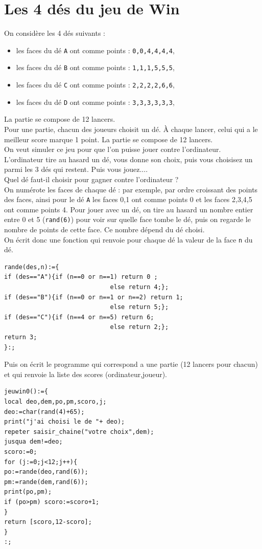 \documentclass[a4paper,11pt]{book}
\begin{document}
\section{Les 4 d\'es du jeu de Win}\label{sec:win}
On consid\`ere les 4 d\'es suivants :
\begin{itemize}
\item les faces du d\'e {\tt A} ont comme points : {\tt 0,0,4,4,4,4}, 
\item les faces du d\'e {\tt B} ont comme points : {\tt 1,1,1,5,5,5},
\item les faces du d\'e {\tt C} ont comme points : {\tt 2,2,2,2,6,6},
\item les faces du d\'e {\tt D} ont comme points : {\tt 3,3,3,3,3,3},
\end{itemize}
La partie se compose de 12 lancers.\\Pour une partie, chacun des joueurs 
choisit un d\'e. \`A chaque lancer, celui
qui a le meilleur score marque 1 point. La partie se compose de 12 lancers.\\
On veut simuler ce jeu pour que l'on puisse jouer contre l'ordinateur.
L'ordinateur tire au hasard un d\'e, vous donne son choix, puis vous
choisisez un parmi les 3 d\'es qui restent. Puis vous jouez....\\
Quel d\'e faut-il choisir pour gagner contre l'ordinateur ?
\ \\
On num\'erote les faces de chaque d\'e : par exemple, par ordre croissant des 
points des faces, ainsi pour le  d\'e {\tt A} les faces 0,1 ont comme 
points 0 et les faces 2,3,4,5 ont comme points 4.  
Pour jouer avec un d\'e, on tire au hasard un nombre entier entre 0 et 
5 ({\tt rand(6)}) pour voir sur quelle face tombe le d\'e, puis on regarde le 
nombre de points de cette face. Ce nombre d\'epend du d\'e choisi.\\
On \'ecrit donc une fonction qui renvoie pour chaque d\'e la valeur de
la face {\tt n} du d\'e. 
\begin{verbatim}
rande(des,n):={
if (des=="A"){if (n==0 or n==1) return 0 ;
                             else return 4;};
if (des=="B"){if (n==0 or n==1 or n==2) return 1; 
                             else return 5;};
if (des=="C"){if (n==4 or n==5) return 6;
                             else return 2;};
return 3;
}:;
\end{verbatim}
Puis on \'ecrit le programme qui correspond a une partie (12 lancers pour 
chacun) et qui renvoie la liste des scores (ordinateur,joueur).
\begin{verbatim}
jeuwin0():={
local deo,dem,po,pm,scoro,j;
deo:=char(rand(4)+65);
print("j'ai choisi le de "+ deo);
repeter saisir_chaine("votre choix",dem);
jusqua dem!=deo;
scoro:=0;
for (j:=0;j<12;j++){
po:=rande(deo,rand(6));
pm:=rande(dem,rand(6));
print(po,pm);
if (po>pm) scoro:=scoro+1;
}
return [scoro,12-scoro];
}
:;
\end{verbatim}
\end{document}
